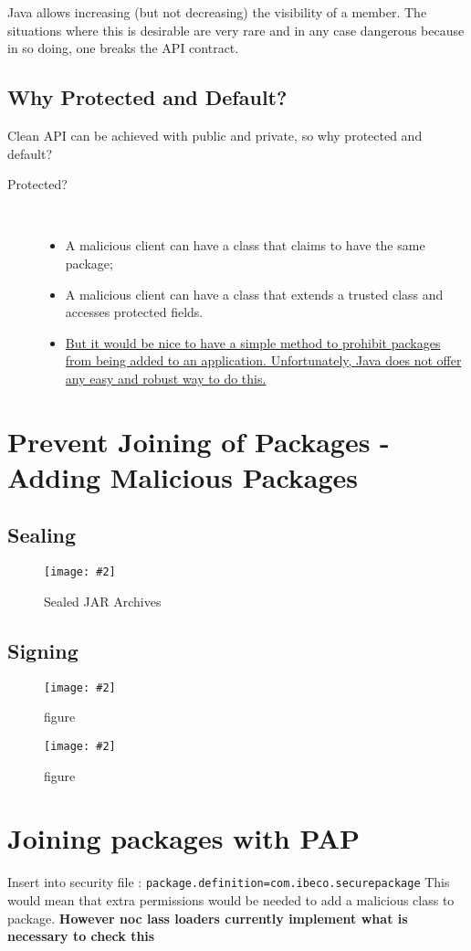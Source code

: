 \documentclass[a4paper,10pt]{scrreprt}
\newcommand{\pic}[2][figure]{\begin{figure}[h]
 \centering
 \texttt{[image: \#2]}
 \caption{#1}
\end{figure}
}
\begin{document}
\begin{framed}
 Java allows increasing (but not decreasing) the visibility of a member. The
situations where this is desirable are very rare and in any case dangerous
because in so doing, one breaks the API contract.
\end{framed}

\subsection{Why Protected and Default?}
Clean API can be achieved with public and private, so why protected and default?\\
\begin{description}
 \item [Protected?] \hfill \\
 \begin{itemize}
  \item A malicious client can have a class that claims to have the same
package;
\item A malicious client can have a class that extends a trusted class and
accesses protected fields.
\item \underline{But it would be nice to have a simple method to prohibit packages from being
added to an application. Unfortunately, Java does not offer any easy and robust
way to do this.}
 \end{itemize}

\end{description}

\section{Prevent Joining of Packages - Adding Malicious Packages}
\subsection{Sealing}
\pic[Sealed JAR Archives]{sja.png}
\subsection{Signing}
\pic{sg1.png}
\pic{sg2.png}

\section{Joining packages with PAP}
Insert into security file :  \texttt{package.definition=com.ibeco.securepackage}
This would mean that extra permissions would be needed to add a malicious class to package. \textbf{However noc lass loaders currently implement what is necessary to check this}
\end{document}
